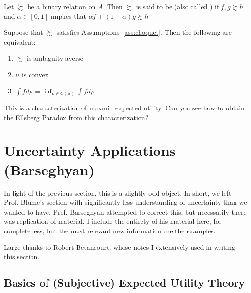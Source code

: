 \documentclass[12pt]{article}
\begin{document}
\begin{definition}
	Let $\succsim$ be a binary relation on $A$. Then $\succsim$ is said to be  (also called ) if $f,g \succsim h$ and $\alpha \in [0,1]$ implies that $\alpha f + (1-\alpha)g \succsim h$
\end{definition}

\begin{theorem}
	Suppose that $\succsim$ satisfies Assumptions~\ref{ass:choquet}. Then the following are equivalent:
	\begin{enumerate}
		\item $\succsim$ is ambiguity-averse
		\item $\mu$ is convex
		\item $\int f d\mu = \inf_{\rho \in C(\mu)} \int f d\rho$
	\end{enumerate}
\end{theorem}
\begin{remark}
	This is a characterization of maxmin expected utility. Can you see how to obtain the Ellsberg Paradox from this characterization?
\end{remark}







\newpage
\section{Uncertainty Applications (Barseghyan)}\label{sec:barseghyan}

\begin{remark}
	In light of the previous section, this is a slightly odd object. In short, we left Prof. Blume's section with significantly less understanding of uncertainty than we wanted to have. Prof. Barseghyan attempted to correct this, but necessarily there was replication of material. I include the entirety of his material here, for completeness, but the most relevant new information are the examples.
\end{remark}

\begin{remark}
	Large thanks to Robert Betancourt, whose notes I extensively used in writing this section.
\end{remark}

\subsection{Basics of (Subjective) Expected Utility Theory}
\end{document}
